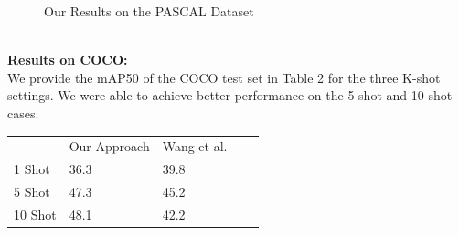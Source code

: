 \documentclass{article}
\begin{document}
\begin{figure}[h!]
\begin{minipage}{0.47\textwidth}
  \label{10 Shot}
  \end{minipage}
  \caption{Our Results on the PASCAL Dataset }
  \label{finetuning}
\end{figure}\\

\textbf{Results on COCO:}\\
We provide the mAP50 of the COCO test set in Table 2 for the three K-shot settings. We were able to achieve better performance on the 5-shot and 10-shot cases.\\
\begin{table}[h!]
\begin{tabular}{lllll}
        & Our Approach & Wang et al. &  &  \\
1 Shot  & 36.3         & 39.8        &  &  \\
5 Shot  & 47.3         & 45.2        &  &  \\
10 Shot & 48.1         & 42.2        &  & 
\end{tabular}
\end{table}\\
\end{document}
